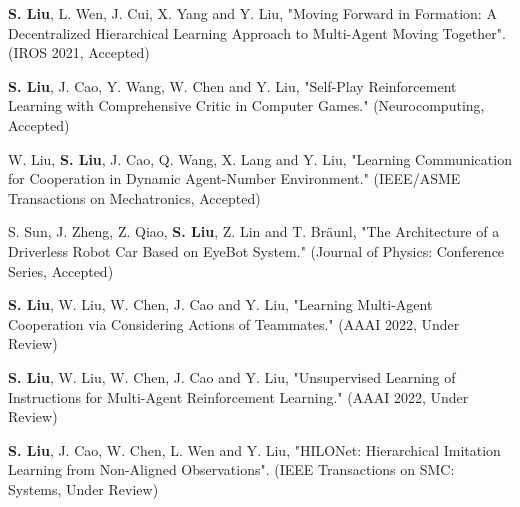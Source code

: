 \begin{itemize}[leftmargin=*]
  {\small
  \item
  \textbf{S. Liu}, L. Wen, J. Cui, X. Yang and Y. Liu, "Moving Forward in Formation: A Decentralized Hierarchical Learning Approach to Multi-Agent Moving Together". (IROS 2021, Accepted)
  \item
  \textbf{S. Liu}, J. Cao, Y. Wang, W. Chen and Y. Liu, "Self-Play Reinforcement Learning with Comprehensive Critic in Computer Games." (Neurocomputing, Accepted)
  \item
  W. Liu, \textbf{S. Liu}, J. Cao, Q. Wang, X. Lang and Y. Liu, "Learning Communication for Cooperation in Dynamic Agent-Number Environment." (IEEE/ASME Transactions on Mechatronics, Accepted)
  \item 
  S. Sun, J. Zheng, Z. Qiao, \textbf{S. Liu}, Z. Lin and T. Bräunl, "The Architecture of a Driverless Robot Car Based on EyeBot System." (Journal of Physics: Conference Series, Accepted)
  \item
  \textbf{S. Liu}, W. Liu, W. Chen, J. Cao and Y. Liu, "Learning Multi-Agent Cooperation via Considering Actions of Teammates." (AAAI 2022, Under Review)
  \item 
  \textbf{S. Liu}, W. Liu, W. Chen, J. Cao and Y. Liu, "Unsupervised Learning of Instructions for Multi-Agent Reinforcement Learning." (AAAI 2022, Under Review)
  \item
  \textbf{S. Liu}, J. Cao, W. Chen, L. Wen and Y. Liu, "HILONet: Hierarchical Imitation Learning from Non-Aligned Observations". (IEEE Transactions on SMC: Systems, Under Review)}

\end{itemize}